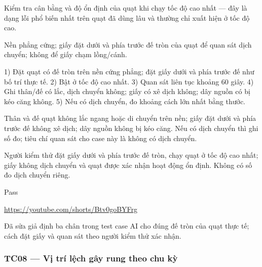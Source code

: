 \begin{description}
\tightlist
\item[Objective]
Kiểm tra cân bằng và độ ổn định của quạt khi chạy tốc độ cao nhất --- đây là dạng lỗi phổ biến nhất trên quạt đã dùng lâu và thường chỉ xuất hiện ở tốc độ cao.
\item[Input]
Nền phẳng cứng; giấy đặt dưới và phía trước đế tròn của quạt để quan sát dịch chuyển; không để giấy chạm lồng/cánh.
\item[Steps]
1) Đặt quạt có đế tròn trên nền cứng phẳng; đặt giấy dưới và phía trước đế như bố trí thực tế. 2) Bật ở tốc độ cao nhất. 3) Quan sát liên tục khoảng 60 giây. 4) Ghi thân/đế có lắc, dịch chuyển không; giấy có xê dịch không; dây nguồn có bị kéo căng không. 5) Nếu có dịch chuyển, đo khoảng cách lớn nhất bằng thước.
\item[Expected]
Thân và đế quạt không lắc ngang hoặc di chuyển trên nền; giấy đặt dưới và phía trước đế không xê dịch; dây nguồn không bị kéo căng. Nếu có dịch chuyển thì ghi số đo; tiêu chí quan sát cho case này là không có dịch chuyển.
\item[Actual]
Người kiểm thử đặt giấy dưới và phía trước đế tròn, chạy quạt ở tốc độ cao nhất; giấy không dịch chuyển và quạt được xác nhận hoạt động ổn định. Không có số đo dịch chuyển riêng.
\item[Verdict]
Pass
\item[Bằng chứng]
\url{https://youtube.com/shorts/Btv0goBYFrg}
\item[Ghi chú rà soát]
Đã sửa giả định ba chân trong test case AI cho đúng đế tròn của quạt thực tế; cách đặt giấy và quan sát theo người kiểm thử xác nhận.
\end{description}

\subsubsection{TC08 --- Vị trí lệch gây rung theo chu kỳ}\label{tc08-vux1ecb-truxed-lux1ec7ch-guxe2y-rung-theo-chu-kux1ef3}


